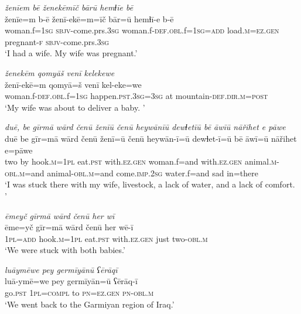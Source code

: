 \ea \label{ZQ.13}
\textit{ženīem bē ženekēmīč bārū hemɫīe bē} \\ 
\gll ženīe=m b-ē ženī-ekē=m=īč bār=ū hemɫī-e b-ē \\ 
 woman.f\textsc{=\textsc{1sg}} \textsc{sbjv-}come.prs\textsc{.3sg} woman.f\textsc{-def}\textsc{.obl}.f\textsc{=\textsc{1sg}}\textsc{=add} load\textsc{.m}\textsc{=ez.gen} pregnant\textsc{-f} \textsc{sbjv-}come.prs\textsc{.3sg} \\ 
\glt `I had a wife. My wife was pregnant.'
\z 
 
\ea \label{ZQ.14}
\textit{ženekēm qomyāš venī kelekewe} \\ 
\gll ženī-ekē=m qomyā=š venī kel-eke=we \\ 
 woman.f\textsc{-def}\textsc{.obl}.f\textsc{=\textsc{1sg}} happen\textsc{.pst}\textsc{.3sg}\textsc{=3sg} at mountain\textsc{-def}\textsc{.dir}\textsc{.m}\textsc{=\textsc{post}} \\ 
\glt `My wife was about to deliver a baby. '
\z 
 
\ea \label{ZQ.16}
\textit{duē, be gīrmā wārd čenū ženīū čenū heywānīū dewɫetīū bē āwīū nāřihet e pāwe} \\ 
\gll duē be gīr=mā wārd čenū ženī=ū čenū heywān-ī=ū dewɫet-ī=ū bē āwī=ū nāřihet e=pāwe \\ 
 two by hook\textsc{.m}\textsc{=\textsc{1pl}} eat\textsc{.pst} with\textsc{.ez.gen} woman.f=and with\textsc{.ez.gen} animal\textsc{.m}\textsc{-obl}\textsc{.m}=and animal\textsc{-obl}\textsc{.m}=and come\textsc{.imp}\textsc{.\textsc{2sg}} water.f=and sad in=there \\ 
\glt `I was stuck there with my wife, livestock, a lack of water, and a lack of comfort. '
\z 
 
\ea \label{ZQ.21}
\textit{ēmeyč gīrmā wārd čenū her wī} \\ 
\gll ēme=yč gīr=mā wārd čenū her wē-ī \\ 
 \textsc{1pl}\textsc{=add} hook\textsc{.m}\textsc{=\textsc{1pl}} eat\textsc{.pst} with\textsc{.ez.gen} just two\textsc{-obl}\textsc{.m} \\ 
\glt `We were stuck with both babies.'
\z 
 
\ea \label{ZQ.27}
\textit{luāymēwe pey germīyānū ʕērāqī} \\ 
\gll luā-ymē=we pey germīyān=ū ʕērāq-ī \\ 
 go\textsc{.pst} \textsc{1pl}\textsc{=compl} to \textsc{pn}\textsc{=ez.gen} \textsc{pn}\textsc{-obl}\textsc{.m} \\ 
\glt `We went back to the Garmiyan region of Iraq.'
\z 
 
